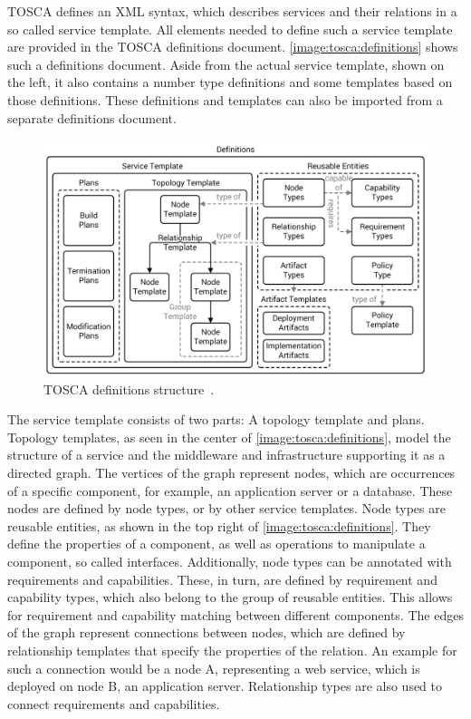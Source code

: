TOSCA defines an XML syntax, which describes services and their relations in a so called service template.
All elements needed to define such a service template are provided in the TOSCA definitions document.
\autoref{image:tosca:definitions} shows such a definitions document.
Aside from the actual service template, shown on the left, it also contains a number type definitions and some templates based on those definitions.
These definitions and templates can also be imported from a separate definitions document.

\begin{figure}[!htbp]
	\centering
	\includegraphics[resolution=600]{fundamentals/assets/definitions}
	\caption{TOSCA definitions structure~\autocite[based on][]{tosca:spec}.}
	\label{image:tosca:definitions}
\end{figure}

The service template consists of two parts: A topology template and plans.
Topology templates, as seen in the center of \autoref{image:tosca:definitions}, model the structure of a service and the middleware and infrastructure supporting it as a directed graph.
The vertices of the graph represent nodes, which are occurrences of a specific component, for example, an application server or a database.
These nodes are defined by node types, or by other service templates.
Node types are reusable entities,  as shown in the top right of \autoref{image:tosca:definitions}.
They define the properties of a component, as well as operations to manipulate a component, so called interfaces.
Additionally, node types can be annotated with requirements and capabilities.
These, in turn, are defined by requirement and capability types, which also belong to the group of reusable entities.
This allows for requirement and capability matching between different components.
The edges of the graph represent connections between nodes, which are defined by relationship templates that specify the properties of the relation.
An example for such a connection would be a node A, representing a web service, which is deployed on node B, an application server.
Relationship types are also used to connect requirements and capabilities.

